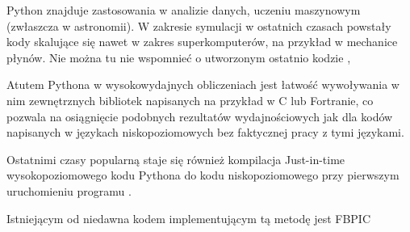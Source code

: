     Python znajduje zastosowania w analizie danych, uczeniu maszynowym
    (zwłaszcza w astronomii). W zakresie symulacji w ostatnich czasach powstały
    kody skalujące się nawet w zakres superkomputerów, na przykład w mechanice
    płynów.  Nie można tu nie wspomnieć o utworzonym ostatnio kodzie
    , 

    Atutem Pythona w wysokowydajnych obliczeniach jest łatwość wywoływania w
    nim zewnętrznych bibliotek napisanych na przykład w C lub Fortranie, co
    pozwala na osiągnięcie podobnych rezultatów wydajnościowych jak dla kodów
    napisanych w językach niskopoziomowych bez faktycznej pracy z tymi
    językami.
    
    Ostatnimi czasy popularną staje się również kompilacja Just-in-time
    wysokopoziomowego kodu Pythona do kodu niskopoziomowego przy pierwszym
    uruchomieniu programu .

    Istniejącym od niedawna kodem implementującym tą metodę jest FBPIC
